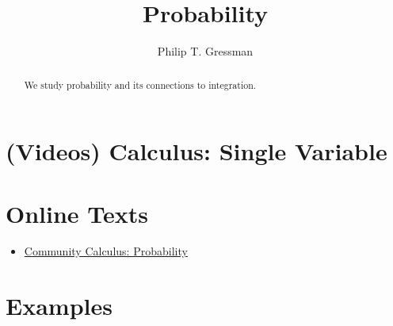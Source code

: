 \documentclass{ximera}
\title{Probability}
\author{Philip T. Gressman}
\begin{document}
\begin{abstract}
  We study probability and its connections to integration.
\end{abstract}
\maketitle

\section*{(Videos) Calculus: Single Variable}

\section*{Online Texts}
\begin{itemize}
\item \href{https://www.whitman.edu/mathematics/calculus_online/section09.08.html}{Community Calculus: Probability}
\end{itemize}

\section*{Examples}

\begin{example}

\end{example}

\begin{example}

\end{example}
\end{document}
